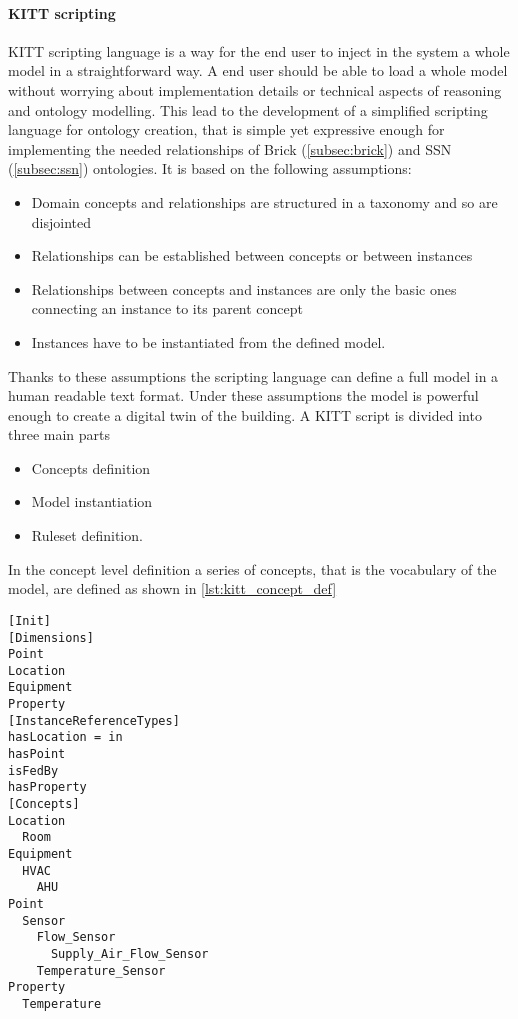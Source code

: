 \paragraph{KITT scripting}
KITT scripting language is a way for the end user to inject in the system a whole model in a straightforward way. A end user should be able to load a whole model without worrying about implementation details or technical aspects of reasoning and ontology modelling. This lead to the development of a simplified scripting language for ontology creation, that is simple yet expressive enough for implementing the needed relationships of Brick (\autoref{subsec:brick}) and SSN (\autoref{subsec:ssn}) ontologies. It is based on the following assumptions:
\begin{itemize}
  \item Domain concepts and relationships are structured in a taxonomy and so are disjointed
  \item Relationships can be established between concepts or between instances
  \item Relationships between concepts and instances are only the basic ones connecting an instance to its parent concept
  \item Instances have to be instantiated from the defined model.
\end{itemize}
Thanks to these assumptions the scripting language can define a full model in a human readable text format. Under these assumptions the model is powerful enough to create a digital twin of the building. A KITT script is divided into three main parts
\begin{itemize}
  \item Concepts definition
  \item Model instantiation
  \item Ruleset definition.
\end{itemize}
In the concept level definition a series of concepts, that is the vocabulary of the model, are defined as shown in \autoref{lst:kitt_concept_def}
\begin{lstlisting}[label={lst:kitt_concept_def}, caption={KITT script for domain definition}, breaklines=true]
[Init]
[Dimensions]
Point
Location
Equipment
Property
[InstanceReferenceTypes]
hasLocation = in
hasPoint
isFedBy
hasProperty
[Concepts]
Location
  Room
Equipment
  HVAC
    AHU
Point
  Sensor
    Flow_Sensor
      Supply_Air_Flow_Sensor
    Temperature_Sensor
Property
  Temperature
\end{lstlisting}
